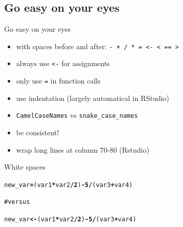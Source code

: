\documentclass{beamer}\usepackage[]{graphicx}\usepackage[]{color}
\makeatletter
\newcommand{\hlnum}[1]{\textcolor[rgb]{0.502,0,0.502}{\textbf{#1}}}%
\newcommand{\hlcom}[1]{\textcolor[rgb]{1,0.502,0}{#1}}%
\newcommand{\hlopt}[1]{\textcolor[rgb]{1,0,0.502}{\textbf{#1}}}%
\newcommand{\hlstd}[1]{\textcolor[rgb]{0,0,0}{#1}}%
\newcommand{\hlkwb}[1]{\textcolor[rgb]{0.502,0.502,0.753}{\textbf{#1}}}%
\newenvironment{kframe}{%
 \def\at@end@of@kframe{}%
 \ifinner\ifhmode%
  \def\at@end@of@kframe{\end{minipage}}%
  \begin{minipage}{\columnwidth}%
 \fi\fi%
 \def\FrameCommand##1{\hskip\@totalleftmargin \hskip-\fboxsep
 \colorbox{shadecolor}{##1}\hskip-\fboxsep
     \hskip-\linewidth \hskip-\@totalleftmargin \hskip\columnwidth}%
 \MakeFramed {\advance\hsize-\width
   \@totalleftmargin\z@ \linewidth\hsize
   \@setminipage}}%
 {\par\unskip\endMakeFramed%
 \at@end@of@kframe}
\newenvironment{knitrout}{}{} %
\makeatother
\begin{document}
\subsection{Go easy on your eyes}

\begin{frame}{Go easy on your eyes}

\begin{itemize}
  \item with spaces before and after: \texttt{-  +  /  *  =  <-  <  ==  > }
  \item always use \texttt{<-} for assignments
  \item only use \texttt{=} in function calls
  \item use indentation (largely automatical in RStudio)
  \item \texttt{CamelCaseNames} vs \texttt{snake\_case\_names}
  \item be consistent!
  \item wrap long lines at column 70-80 (Rstudio)
\end{itemize}

\end{frame}


\begin{frame}[fragile]{White spaces}

\begin{knitrout}
\color{fgcolor}\begin{kframe}
\begin{alltt}
\hlstd{new_var}\hlkwb{=}\hlstd{(var1}\hlopt{*}\hlstd{var2}\hlopt{/}\hlnum{2}\hlstd{)}\hlopt{-}\hlnum{5}\hlopt{/}\hlstd{(var3}\hlopt{+}\hlstd{var4)}

\hlcom{# versus}

\hlstd{new_var} \hlkwb{<-} \hlstd{(var1} \hlopt{*} \hlstd{var2} \hlopt{/} \hlnum{2}\hlstd{)} \hlopt{-} \hlnum{5} \hlopt{/} \hlstd{(var3} \hlopt{+} \hlstd{var4)}
\end{alltt}
\end{kframe}
\end{knitrout}

\end{frame}
\end{document}
